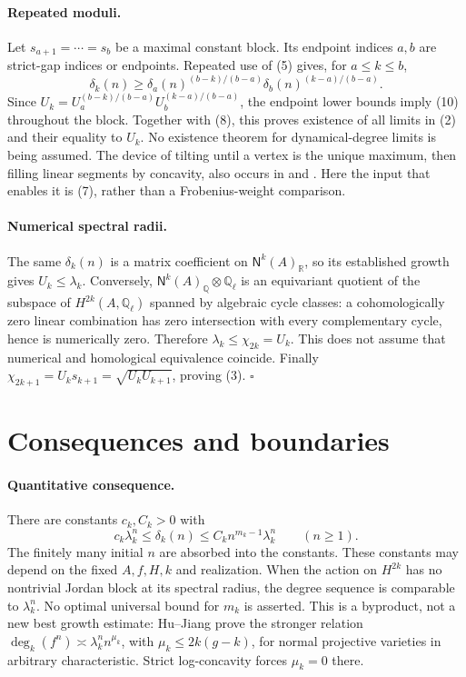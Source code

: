 \documentclass[11pt]{article}
\newcommand{\Q}{\mathbb Q}
\newcommand{\R}{\mathbb R}
\newcommand{\N}{\mathsf N}
\begin{document}
\paragraph{Repeated moduli.}
Let \(s_{a+1}=\cdots=s_b\) be a maximal constant block.
Its endpoint indices \(a,b\) are strict-gap indices or endpoints.
Repeated use of (5) gives, for \(a\le k\le b\),
\[
 \delta_k(n)\ge
 \delta_a(n)^{(b-k)/(b-a)}
 \delta_b(n)^{(k-a)/(b-a)}.
 \tag{11}
\]
Since \(U_k=U_a^{(b-k)/(b-a)}U_b^{(k-a)/(b-a)}\), the endpoint lower
bounds imply (10) throughout the block. Together with (8), this
proves existence of all limits in (2) and their equality to \(U_k\).
No existence theorem for dynamical-degree limits is being assumed.
The device of tilting until a vertex is the unique maximum, then filling
linear segments by concavity, also occurs in \cite[\S2.5]{Xie} and
\cite[Lemma 2.2 and the proof of Theorem 1.5]{HTX}. Here the input that enables it is (7), rather than
a Frobenius-weight comparison.

\paragraph{Numerical spectral radii.}
The same \(\delta_k(n)\) is a matrix coefficient on \(\N^k(A)_\R\),
so its established growth gives \(U_k\le\lambda_k\).
Conversely, \(\N^k(A)_\Q\otimes\Q_\ell\) is an equivariant quotient of
the subspace of \(H^{2k}(A,\Q_\ell)\) spanned by algebraic cycle classes:
a cohomologically zero linear combination has zero intersection with
every complementary cycle, hence is numerically zero.
Therefore \(\lambda_k\le\chi_{2k}=U_k\).
This does not assume that numerical and homological equivalence coincide.
Finally \(\chi_{2k+1}=U_ks_{k+1}=\sqrt{U_kU_{k+1}}\), proving (3).
\hfill\(\square\)

\section{Consequences and boundaries}
\paragraph{Quantitative consequence.}
There are constants \(c_k,C_k>0\) with
\[
 c_k\lambda_k^n\le\delta_k(n)
 \le C_k n^{m_k-1}\lambda_k^n\qquad(n\ge1).
 \tag{12}
\]
The finitely many initial \(n\) are absorbed into the constants.
These constants may depend on the fixed \(A,f,H,k\) and realization.
When the action on \(H^{2k}\) has no nontrivial Jordan block at its
spectral radius, the degree sequence is comparable to \(\lambda_k^n\).
No optimal universal bound for \(m_k\) is asserted. This is a byproduct,
not a new best growth estimate: Hu--Jiang \cite[Theorem 1.2,
Proposition 5.1]{HJ} prove the stronger relation
\(\deg_k(f^n)\asymp\lambda_k^n n^{\mu_k}\), with
\(\mu_k\le2k(g-k)\), for normal projective varieties in arbitrary
characteristic. Strict log-concavity forces \(\mu_k=0\) there.
\end{document}
